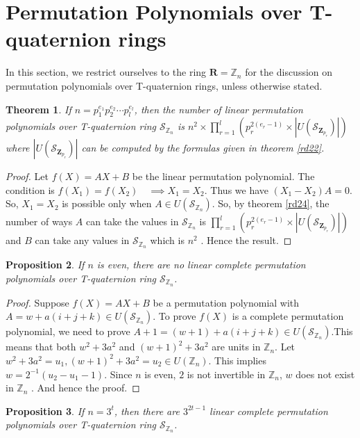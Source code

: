 \documentclass[sn-mathphys,Numbered]{sn-jnl}%
\theoremstyle{thmstyleone}
\newtheorem{theorem}{Theorem}
\newtheorem{proposition}[theorem]{Proposition}
\theoremstyle{thmstyletwo}
\theoremstyle{thmstylethree}
\begin{document}
\section{Permutation Polynomials over T-quaternion rings}
In this section, we restrict ourselves to the ring $\mathbf{R}=\mathbb{Z}_{n}$ for the discussion on permutation polynomials over T-quaternion rings, unless otherwise stated. 
\begin{theorem} 
If $n=p_{1}^{e_{1}}p_{2}^{e_{2}} \cdots p_{l}^{e_{l}}$, then the number of linear permutation polynomials over T-quaternion ring $\mathcal{S}_{\mathbb{Z}_{n}}$ is  $n^{2}\times\prod_{r=1}^{l} (p_{r}^{2(e_{r}-1)} \times |U(\mathcal{S}_{\mathbf{Z}_{p_{r}}})| )$ where $|U(\mathcal{S}_{\mathbf{Z}_{p_{r}}})|$ can be computed by the formulas given in theorem \ref{rd22}.
\end{theorem}
\begin{proof}
Let $f(X)=AX+B$ be the linear permutation polynomial. The condition is $f(X_{1})=f(X_{2}) \quad \implies X_{1}=X_{2}$.  Thus we have $(X_{1}-X_{2})A=0$. So, $X_{1}=X_{2}$ is possible only when $A \in U(\mathcal{S}_{\mathbb{Z}_{n}})$. So, by theorem \ref{rd24}, the number of ways $A$ can take the values in $\mathcal{S}_{\mathbb{Z}_{n}}$ is $\prod_{r=1}^{l} (p_{r}^{2(e_{r}-1)} \times |U(\mathcal{S}_{\mathbf{Z}_{p_{r}}})| )$  and $B$  can take any values in $\mathcal{S}_{\mathbb{Z}_{n}}$ which is $n^{2}$ . Hence the result. 
\end{proof}
\begin{proposition}
If $n$ is even, there are no linear complete permutation polynomials over T-quaternion ring $\mathcal{S}_{\mathbb{Z}_{n}}$.
\end{proposition}
\begin{proof}
Suppose $f(X)=AX+B$ be a permutation polynomial with $A=w+a(i+j+k) \in  U(\mathcal{S}_{\mathbb{Z}_{n}})$. To prove $f(X)$ is a complete permutation polynomial, we need to prove $A+1=(w+1)+a(i+j+k) \in  U(\mathcal{S}_{\mathbb{Z}_{n}})$.This means that both $w^{2}+3a^{2}$ and $(w+1)^{2}+3a^{2}$ are units in $\mathbb{Z}_{n}$. Let  $w^{2}+3a^{2}=u_{1}, (w+1)^{2}+3a^{2}=u_{2} \in U(\mathbb{Z}_{n})$. This implies $w=2^{-1}(u_{2}-u_{1}-1)$. Since $n$ is even, $2$ is not invertible in $\mathbb{Z}_{n}$,  $w$  does not exist in $\mathbb{Z}_{n}$ . And hence the proof.
\end{proof}
\begin{proposition}
If $n=3^{t}$, then there are $3^{2t-1}$ linear complete permutation polynomials over T-quaternion ring $\mathcal{S}_{\mathbb{Z}_{n}}$.
\end{proposition}
\end{document}
